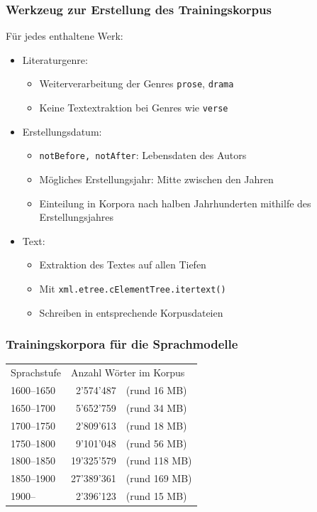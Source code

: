 \documentclass[t]{beamer} %
\begin{document}
\begin{frame}
  \frametitle{Werkzeug zur Erstellung des Trainingskorpus}
  Für jedes enthaltene Werk:
  
  \begin{itemize}
  \item Literaturgenre:
    \begin{itemize}
    \item Weiterverarbeitung der Genres \texttt{prose}, \texttt{drama} 
    \item Keine Textextraktion bei Genres wie \texttt{verse}
    \end{itemize}
    \vspace*{1ex}
    \pause

  \item Erstellungsdatum:
    \begin{itemize}
    \item \texttt{notBefore, notAfter}: Lebensdaten des Autors
    \item Mögliches Erstellungsjahr: Mitte zwischen den Jahren 
    \item Einteilung in Korpora nach halben Jahrhunderten mithilfe des Erstellungsjahres
    \end{itemize}
    \vspace*{1ex}
    \pause
    
  \item Text:
    \begin{itemize}
    \item Extraktion des Textes auf allen Tiefen
    \item Mit \texttt{xml.etree.cElementTree.itertext()}
    \item Schreiben in entsprechende Korpusdateien
    \end{itemize}
  \end{itemize}
\end{frame}

\begin{frame}
  \frametitle{Trainingskorpora für die Sprachmodelle}
  \begin{tabular}{lrl}
  Sprachstufe & \multicolumn{2}{l}{Anzahl Wörter im Korpus}
  \vspace*{1ex}\\
  1600--1650 & 2'574'487 &(rund 16 MB)\\
  1650--1700 & 5'652'759 &(rund 34 MB)\\
  1700--1750 & 2'809'613 &(rund 18 MB)\\
  1750--1800 & 9'101'048 &(rund 56 MB)\\
  1800--1850 & 19'325'579 &(rund 118 MB)\\
  1850--1900 & 27'389'361 &(rund 169 MB)\\
  1900--     & 2'396'123 &(rund 15 MB)
  \end{tabular}
\end{frame}
\end{document}
